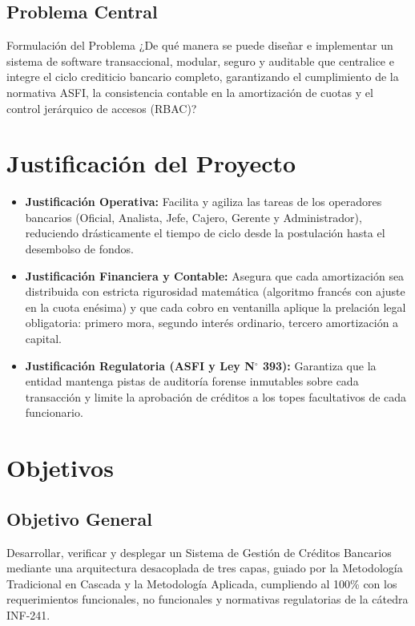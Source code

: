 \documentclass[11pt,letterpaper]{report}
\begin{document}
\subsection{Problema Central}
\begin{docBox}{Formulación del Problema}
¿De qué manera se puede diseñar e implementar un sistema de software transaccional, modular, seguro y auditable que centralice e integre el ciclo crediticio bancario completo, garantizando el cumplimiento de la normativa ASFI, la consistencia contable en la amortización de cuotas y el control jerárquico de accesos (RBAC)?
\end{docBox}

\section{Justificación del Proyecto}
\begin{itemize}
    \item \textbf{Justificación Operativa:} Facilita y agiliza las tareas de los operadores bancarios (Oficial, Analista, Jefe, Cajero, Gerente y Administrador), reduciendo drásticamente el tiempo de ciclo desde la postulación hasta el desembolso de fondos.
    \item \textbf{Justificación Financiera y Contable:} Asegura que cada amortización sea distribuida con estricta rigurosidad matemática (algoritmo francés con ajuste en la cuota enésima) y que cada cobro en ventanilla aplique la prelación legal obligatoria: primero mora, segundo interés ordinario, tercero amortización a capital.
    \item \textbf{Justificación Regulatoria (ASFI y Ley N$^\circ$ 393):} Garantiza que la entidad mantenga pistas de auditoría forense inmutables sobre cada transacción y limite la aprobación de créditos a los topes facultativos de cada funcionario.
\end{itemize}

\section{Objetivos}
\subsection{Objetivo General}
Desarrollar, verificar y desplegar un Sistema de Gestión de Créditos Bancarios mediante una arquitectura desacoplada de tres capas, guiado por la Metodología Tradicional en Cascada y la Metodología Aplicada, cumpliendo al 100\% con los requerimientos funcionales, no funcionales y normativas regulatorias de la cátedra INF-241.
\end{document}
